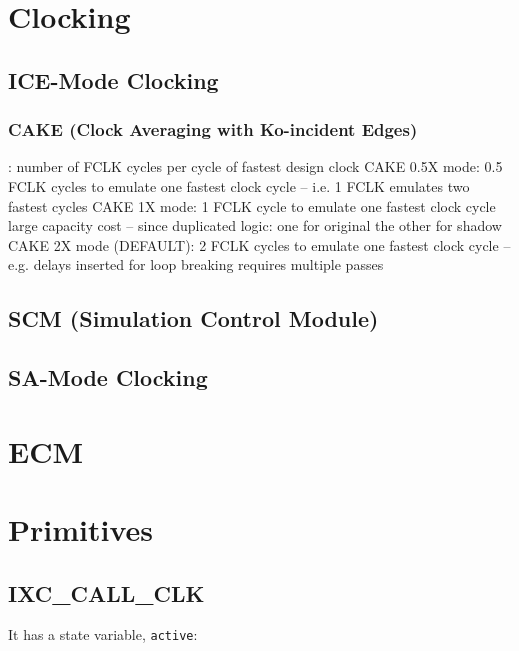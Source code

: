 \documentclass{note}
\begin{document}
\section{Clocking}
\subsection{ICE-Mode Clocking}
\subsubsection{CAKE (Clock Averaging with Ko-incident Edges)}
\bit
\w {}: number of FCLK cycles per cycle of fastest
    design clock
    \bit
    \w CAKE 0.5X mode: 0.5 FCLK cycles to emulate one fastest clock cycle --
    i.e. 1 FCLK emulates two fastest cycles
      \bit
      \w 
      \eit
    \w CAKE 1X mode: 1 FCLK cycle to emulate one fastest clock cycle
      \bit
      \w large capacity cost -- since duplicated logic: one for original the
      other for shadow
      \eit
    \w CAKE 2X mode (DEFAULT): 2 FCLK cycles to emulate one fastest clock cycle --
        e.g. delays inserted for loop breaking requires multiple passes
      \bit
      \w 
      \eit
    \eit
\eit
\subsection{SCM (Simulation Control Module)}
\subsection{SA-Mode Clocking}


\section{ECM}


\section{Primitives}
\subsection{IXC\_CALL\_CLK}
\bit
\w It has a state variable, \verb+active+:
\eit
\end{document}
